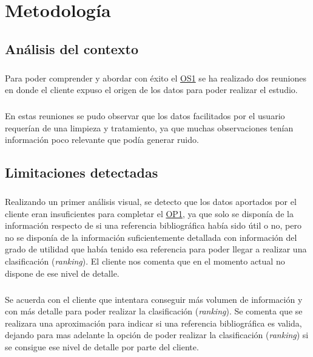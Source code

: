 \chapter{Metodología}
\label{chapter:metodologia}


\section{Análisis del contexto}

\paragraph{}
Para poder comprender y abordar con éxito el \hyperref[os:OS1]{OS1} se ha realizado dos reuniones en donde el cliente expuso el origen de los datos para poder realizar el estudio.

\paragraph{}
En estas reuniones se pudo observar que los datos facilitados por el usuario requerían de una limpieza y tratamiento, ya que muchas observaciones tenían información poco relevante que podía generar ruido\cite{ref:noisy_data}.

\section{Limitaciones detectadas}
\label{section:limit}

\paragraph{}
Realizando un primer análisis visual, se detecto que los datos aportados por el cliente eran insuficientes para completar el \hyperref[op:OP1]{OP1}, ya que solo se disponía de la información respecto de si una referencia bibliográfica había sido útil o no, pero no se disponía de la información suficientemente detallada con información del grado de utilidad que había tenido esa referencia para poder llegar a realizar una clasificación (\textit{ranking}). El cliente nos comenta que en el momento actual no dispone de ese nivel de detalle.

\paragraph{}
Se acuerda con el cliente que intentara conseguir más volumen de información y con más detalle para poder realizar la clasificación (\textit{ranking}). Se comenta que se realizara una aproximación para indicar si una referencia bibliográfica es valida, dejando para mas adelante la opción de poder realizar la clasificación (\textit{ranking}) si se consigue ese nivel de detalle por parte del cliente.

